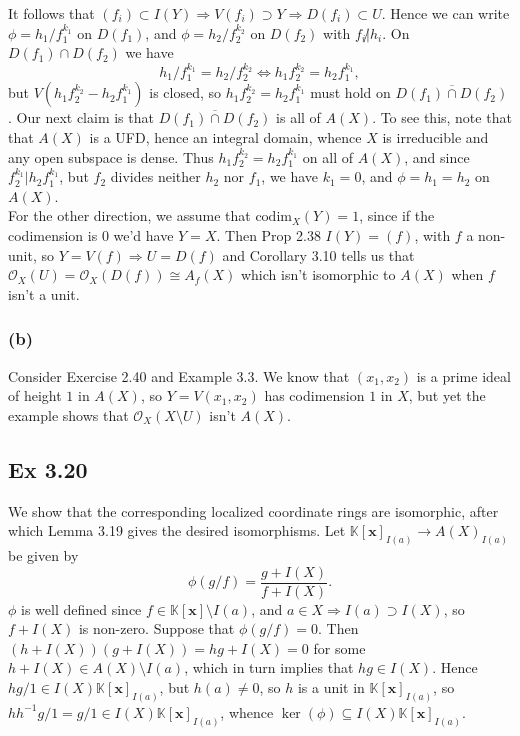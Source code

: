 \documentclass{article}
\theoremstyle{definition}
\newcommand{\K}{\mathbb{K}}
\newcommand{\Kx}{\K[\bm{x}]}
\newcommand{\codim}{\text{codim}}
\begin{document}
It follows that $(f_i) \subset I(Y) \Rightarrow V(f_i) \supset Y \Rightarrow
D(f_i) \subset U$. Hence we can write $\phi = h_1/f_1^{k_1}$ on $D(f_1)$, and
$\phi = h_2/f_2^{k_2}$ on $D(f_2)$ with $f_i \not | h_i$. On $D(f_1) \cap
D(f_2)$ we have 
\[
 h_1/f_1^{k_1}
 =
 h_2/f_2^{k_2}
 \Leftrightarrow
 h_1f_2^{k_2} = h_2 f_1^{k_1},
\] 
but $V(h_1f_2^{k_2} - h_2f_1^{k_1})$ is closed, so $h_1f_2^{k_2} = h_2
f_1^{k_1}$ must hold on $\overline{D(f_1) \cap D(f_2)}$. Our next claim is that
$\overline{D(f_1) \cap D(f_2)}$ is all of $A(X)$. To see this, note that that
$A(X)$ is a UFD, hence an integral domain, whence $X$ is irreducible and any
open subspace is dense. Thus $h_1f_2^{k_2} = h_2 f_1^{k_1}$ on all of $A(X)$,
and since $f_2^{k_1} | h_2f_1^{k_1}$, but $f_2$ divides neither $h_2$ nor
$f_1$, we have $k_1 = 0$, and $\phi = h_1 = h_2$ on $A(X)$. \\

For the other direction, we assume that $\codim_X(Y) = 1$, since if the
codimension is $0$ we'd have $Y = X$. Then Prop 2.38 $I(Y) = (f)$, with $f$ a
non-unit, so $Y = V(f) \Rightarrow U = D(f)$ and Corollary 3.10 tells us that
$\mathcal{O}_X(U) = \mathcal{O}_X(D(f)) \cong A_{f}(X)$ which isn't isomorphic
to $A(X)$ when $f$ isn't a unit.

\subsubsection*{(b)} 

Consider Exercise 2.40 and Example 3.3. We know that $(x_1, x_2)$ is a prime
ideal of height $1$ in $A(X)$, so $Y = V(x_1, x_2)$ has codimension $1$ in $X$,
but yet the example shows that $\mathcal{O}_X(X \setminus U)$ isn't $A(X)$.


\subsection*{Ex 3.20} 

We show that the corresponding localized coordinate rings are isomorphic, after
which Lemma 3.19 gives the desired isomorphisms. Let $\Kx_{I(a)} \to
A(X)_{I(a)}$ be given by 
\[
	\phi\left(
		g/f
	\right)
	=
	\frac{g + I(X)}{f + I(X)}.
\]
$\phi$ is well defined since $f \in \Kx \setminus I(a)$, and $a \in X
\Rightarrow I(a) \supset I(X)$, so $f + I(X)$ is non-zero. Suppose that
$\phi(g/f) = 0$. Then $(h + I(X))(g + I(X)) = hg + I(X) = 0$ for some $h + I(X)
\in A(X) \setminus I(a)$, which in turn implies that $hg \in I(X)$. Hence $hg/1
\in I(X)\Kx_{I(a)}$, but $h(a) \not = 0$, so $h$ is a unit in $\Kx_{I(a)}$, so
$hh^{-1}g/1 = g/1 \in I(X)\Kx_{I(a)}$, whence $\ker(\phi) \subseteq
I(X)\Kx_{I(a)}$. \\
\end{document}
